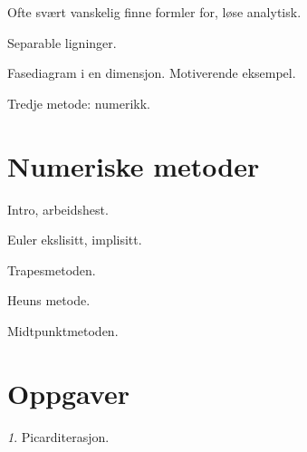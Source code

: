 \documentclass{article}
\theoremstyle{plain}
\theoremstyle{definition}
\theoremstyle{remark}
\newtheorem{oppg}{}
\begin{document}
Ofte svært vanskelig finne formler for, løse analytisk.

Separable ligninger.

Fasediagram i en dimensjon. Motiverende eksempel.

Tredje metode: numerikk.


\section*{Numeriske metoder}

Intro, arbeidshest.

Euler ekslisitt, implisitt.

Trapesmetoden.

Heuns metode.

Midtpunktmetoden.


\section*{Oppgaver}

\begin{oppg}
    Picarditerasjon.
\end{oppg}
\end{document}
